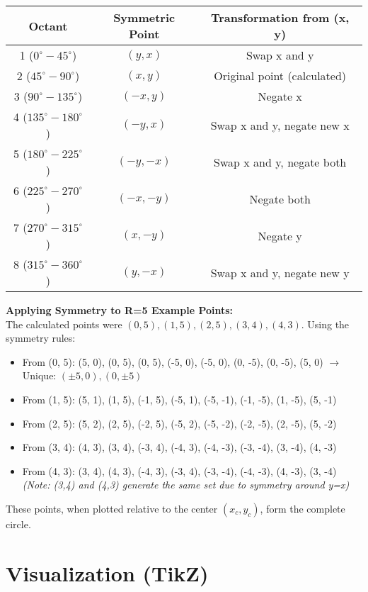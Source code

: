 \documentclass[12pt, a4paper]{article}
\begin{document}
\begin{center}
\label{tab:symmetry}
\begin{tabular}{ccc}
\toprule
\textbf{Octant} & \textbf{Symmetric Point} & \textbf{Transformation from (x, y)} \\
\midrule
1 ($0^\circ-45^\circ$) & $(y, x)$ & Swap x and y \\
2 ($45^\circ-90^\circ$) & $(x, y)$ & Original point (calculated) \\
3 ($90^\circ-135^\circ$) & $(-x, y)$ & Negate x \\
4 ($135^\circ-180^\circ$) & $(-y, x)$ & Swap x and y, negate new x \\
5 ($180^\circ-225^\circ$) & $(-y, -x)$ & Swap x and y, negate both \\
6 ($225^\circ-270^\circ$) & $(-x, -y)$ & Negate both \\
7 ($270^\circ-315^\circ$) & $(x, -y)$ & Negate y \\
8 ($315^\circ-360^\circ$) & $(y, -x)$ & Swap x and y, negate new y \\
\bottomrule
\end{tabular}
\end{center}

\textbf{Applying Symmetry to R=5 Example Points:}\\
The calculated points were $(0, 5), (1, 5), (2, 5), (3, 4), (4, 3)$.
Using the symmetry rules:
\begin{itemize}
    \item From (0, 5): (5, 0), (0, 5), (0, 5), (-5, 0), (-5, 0), (0, -5), (0, -5), (5, 0) $\rightarrow$ Unique: $(\pm 5, 0), (0, \pm 5)$
    \item From (1, 5): (5, 1), (1, 5), (-1, 5), (-5, 1), (-5, -1), (-1, -5), (1, -5), (5, -1)
    \item From (2, 5): (5, 2), (2, 5), (-2, 5), (-5, 2), (-5, -2), (-2, -5), (2, -5), (5, -2)
    \item From (3, 4): (4, 3), (3, 4), (-3, 4), (-4, 3), (-4, -3), (-3, -4), (3, -4), (4, -3)
    \item From (4, 3): (3, 4), (4, 3), (-4, 3), (-3, 4), (-3, -4), (-4, -3), (4, -3), (3, -4) \textit{(Note: (3,4) and (4,3) generate the same set due to symmetry around y=x)}
\end{itemize}
These points, when plotted relative to the center $(x_c, y_c)$, form the complete circle.

\section{Visualization (TikZ)}
\end{document}
